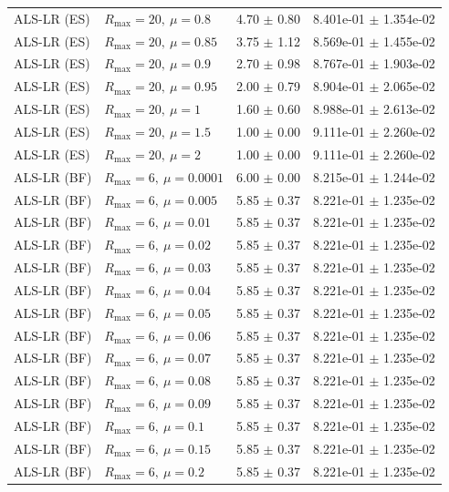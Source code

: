 \begin{table}[t]
\begin{tabular}{@{}llcc@{}}
ALS-LR (ES) & \(R_{\max}=20,\ \mu=0.8\) & 4.70 $\pm$ 0.80 & 8.401e-01 $\pm$ 1.354e-02 \\
ALS-LR (ES) & \(R_{\max}=20,\ \mu=0.85\) & 3.75 $\pm$ 1.12 & 8.569e-01 $\pm$ 1.455e-02 \\
ALS-LR (ES) & \(R_{\max}=20,\ \mu=0.9\) & 2.70 $\pm$ 0.98 & 8.767e-01 $\pm$ 1.903e-02 \\
ALS-LR (ES) & \(R_{\max}=20,\ \mu=0.95\) & 2.00 $\pm$ 0.79 & 8.904e-01 $\pm$ 2.065e-02 \\
ALS-LR (ES) & \(R_{\max}=20,\ \mu=1\) & 1.60 $\pm$ 0.60 & 8.988e-01 $\pm$ 2.613e-02 \\
ALS-LR (ES) & \(R_{\max}=20,\ \mu=1.5\) & 1.00 $\pm$ 0.00 & 9.111e-01 $\pm$ 2.260e-02 \\
ALS-LR (ES) & \(R_{\max}=20,\ \mu=2\) & 1.00 $\pm$ 0.00 & 9.111e-01 $\pm$ 2.260e-02 \\
ALS-LR (BF) & \(R_{\max}=6,\ \mu=0.0001\) & 6.00 $\pm$ 0.00 & 8.215e-01 $\pm$ 1.244e-02 \\
ALS-LR (BF) & \(R_{\max}=6,\ \mu=0.005\) & 5.85 $\pm$ 0.37 & 8.221e-01 $\pm$ 1.235e-02 \\
ALS-LR (BF) & \(R_{\max}=6,\ \mu=0.01\) & 5.85 $\pm$ 0.37 & 8.221e-01 $\pm$ 1.235e-02 \\
ALS-LR (BF) & \(R_{\max}=6,\ \mu=0.02\) & 5.85 $\pm$ 0.37 & 8.221e-01 $\pm$ 1.235e-02 \\
ALS-LR (BF) & \(R_{\max}=6,\ \mu=0.03\) & 5.85 $\pm$ 0.37 & 8.221e-01 $\pm$ 1.235e-02 \\
ALS-LR (BF) & \(R_{\max}=6,\ \mu=0.04\) & 5.85 $\pm$ 0.37 & 8.221e-01 $\pm$ 1.235e-02 \\
ALS-LR (BF) & \(R_{\max}=6,\ \mu=0.05\) & 5.85 $\pm$ 0.37 & 8.221e-01 $\pm$ 1.235e-02 \\
ALS-LR (BF) & \(R_{\max}=6,\ \mu=0.06\) & 5.85 $\pm$ 0.37 & 8.221e-01 $\pm$ 1.235e-02 \\
ALS-LR (BF) & \(R_{\max}=6,\ \mu=0.07\) & 5.85 $\pm$ 0.37 & 8.221e-01 $\pm$ 1.235e-02 \\
ALS-LR (BF) & \(R_{\max}=6,\ \mu=0.08\) & 5.85 $\pm$ 0.37 & 8.221e-01 $\pm$ 1.235e-02 \\
ALS-LR (BF) & \(R_{\max}=6,\ \mu=0.09\) & 5.85 $\pm$ 0.37 & 8.221e-01 $\pm$ 1.235e-02 \\
ALS-LR (BF) & \(R_{\max}=6,\ \mu=0.1\) & 5.85 $\pm$ 0.37 & 8.221e-01 $\pm$ 1.235e-02 \\
ALS-LR (BF) & \(R_{\max}=6,\ \mu=0.15\) & 5.85 $\pm$ 0.37 & 8.221e-01 $\pm$ 1.235e-02 \\
ALS-LR (BF) & \(R_{\max}=6,\ \mu=0.2\) & 5.85 $\pm$ 0.37 & 8.221e-01 $\pm$ 1.235e-02 \\

\end{tabular}
\end{table}
